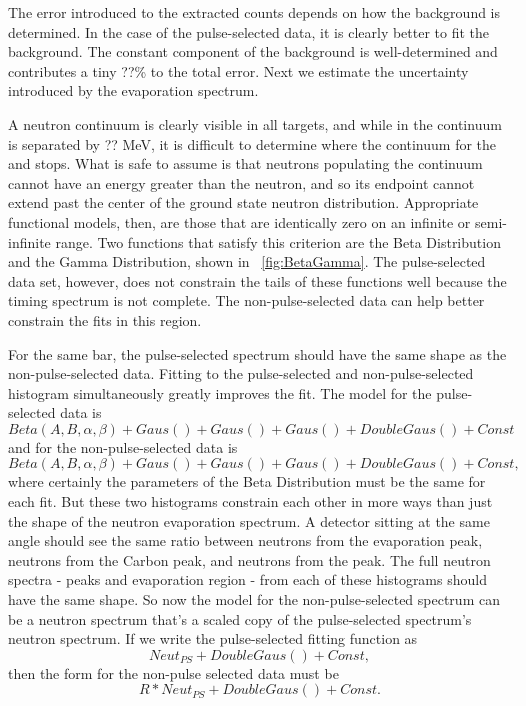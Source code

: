 The error introduced to the extracted counts depends on how the background is determined.  In the case of the pulse-selected data, it is clearly better to fit the background.  The constant component of the background is well-determined and contributes a tiny ??\% to the total error.  Next we estimate the uncertainty introduced by the evaporation spectrum.

A neutron continuum is clearly visible in all targets, and while in  the continuum is separated by ?? MeV, it is difficult to determine where the continuum for the  and  stops.  What is safe to assume is that neutrons populating the continuum cannot have an energy greater than the \zp neutron, and so its endpoint cannot extend past the center of the ground state neutron distribution.  Appropriate functional models, then, are those that are identically zero on an infinite or semi-infinite range.  Two functions that satisfy this criterion are the Beta Distribution and the Gamma Distribution, shown in {\fig}~\ref{fig:BetaGamma}.  The pulse-selected data set, however, does not constrain the tails of these functions well because the timing spectrum is not complete.  The non-pulse-selected data can help better constrain the fits in this region.

For the same bar, the pulse-selected spectrum should have the same shape as the non-pulse-selected data.  Fitting to the pulse-selected and non-pulse-selected histogram simultaneously greatly improves the fit.  The model for the pulse-selected data is
\begin{equation}
Beta(A,B,\alpha,\beta) + Gaus() + Gaus() + Gaus() + DoubleGaus() + Const
\end{equation}
and for the non-pulse-selected data is
\begin{equation}
Beta(A,B,\alpha,\beta) + Gaus() + Gaus() + Gaus() + DoubleGaus() + Const,
\end{equation}
where certainly the parameters of the Beta Distribution must be the same for each fit.  But these two histograms constrain each other in more ways than just the shape of the neutron evaporation spectrum.  A detector sitting at the same angle should see the same ratio between neutrons from the evaporation peak, neutrons from the Carbon peak, and neutrons from the \zp peak.  The full neutron spectra - peaks and evaporation region - from each of these histograms should have the same shape.  So now the model for the non-pulse-selected spectrum can be a neutron spectrum that's a scaled copy of the pulse-selected spectrum's neutron spectrum.  If we write the pulse-selected fitting function as 
\begin{equation}
Neut_{PS} + DoubleGaus() + Const,
\end{equation}
then the form for the non-pulse selected data must be
\begin{equation}
R*Neut_{PS} + DoubleGaus() + Const.
\end{equation}

